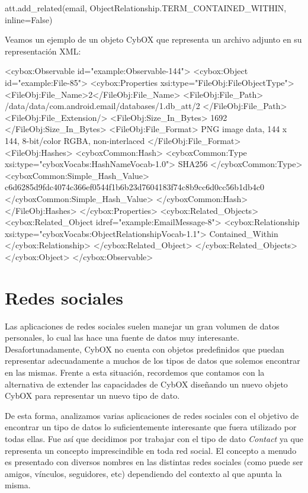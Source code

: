 \begin{python}
att.add_related(email,
             ObjectRelationship.TERM_CONTAINED_WITHIN, 
             inline=False)
\end{python}

Veamos un ejemplo de un objeto CybOX que representa un archivo adjunto en su representación XML:
\newline

\begin{xml}
<cybox:Observable id="example:Observable-144">
  <cybox:Object id="example:File-85">
    <cybox:Properties xsi:type="FileObj:FileObjectType">
      <FileObj:File_Name>2</FileObj:File_Name>
      <FileObj:File_Path>
/data/data/com.android.email/databases/1.db_att/2
      </FileObj:File_Path>
      <FileObj:File_Extension/>
      <FileObj:Size_In_Bytes>
        1692
      </FileObj:Size_In_Bytes>
      <FileObj:File_Format>
        PNG image data, 144 x 144, 
        8-bit/color RGBA, non-interlaced
      </FileObj:File_Format>
      <FileObj:Hashes>
        <cyboxCommon:Hash>
          <cyboxCommon:Type xsi:type="cyboxVocabs:HashNameVocab-1.0">
            SHA256
          </cyboxCommon:Type>
          <cyboxCommon:Simple_Hash_Value>
c6d6285d9fdc4074c366ef0544f1b6b23d7604183f74c8b9cc6d0cc56b1db4c0
          </cyboxCommon:Simple_Hash_Value>
        </cyboxCommon:Hash>
      </FileObj:Hashes>
    </cybox:Properties>
    <cybox:Related_Objects>
      <cybox:Related_Object idref="example:EmailMessage-8">
        <cybox:Relationship xsi:type="cyboxVocabs:ObjectRelationshipVocab-1.1">
          Contained_Within
        </cybox:Relationship>
      </cybox:Related_Object>
    </cybox:Related_Objects>
  </cybox:Object>
</cybox:Observable>
\end{xml}

\section{Redes sociales}
Las aplicaciones de redes sociales suelen manejar un gran volumen de datos personales, lo cual las hace una fuente de datos muy interesante. Desafortunadamente, CybOX no cuenta con objetos predefinidos que puedan representar adecuadamente a muchos de los tipos de datos que solemos encontrar en las mismas. Frente a esta situación, recordemos que contamos con la alternativa de extender las capacidades de CybOX diseñando un nuevo objeto CybOX para representar un nuevo tipo de dato.

De esta forma, analizamos varias aplicaciones de redes sociales con el objetivo de encontrar un tipo de datos lo suficientemente interesante que fuera utilizado por todas ellas. Fue así que decidimos por trabajar con el tipo de dato \emph{Contact} ya que representa un concepto imprescindible en toda red social. El concepto a menudo es presentado con diversos nombres en las distintas redes sociales (como puede ser amigos, vínculos, seguidores, etc) dependiendo del contexto al que apunta la misma.

